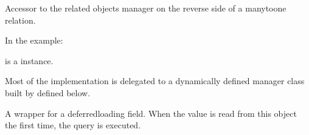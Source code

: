 \documentclass[a4paper,11pt,spanish]{sphinxmanual}
\begin{document}
\begin{fulllineitems}

\begin{fulllineitems}
\label{\detokenize{api/CashRegister/CashRegister.models:CashRegister.models.CashSession.movements}}
\pysigstartsignatures
\pysigline
{}
\pysigstopsignatures
\sphinxAtStartPar
Accessor to the related objects manager on the reverse side of a
many\sphinxhyphen{}to\sphinxhyphen{}one relation.

\sphinxAtStartPar
In the example:

\begin{sphinxVerbatim}[commandchars=\\\{\}]
       
\end{sphinxVerbatim}

\sphinxAtStartPar
{} is a  instance.

\sphinxAtStartPar
Most of the implementation is delegated to a dynamically defined manager
class built by  defined below.

\end{fulllineitems}


\begin{fulllineitems}
\label{\detokenize{api/CashRegister/CashRegister.models:CashRegister.models.CashSession.notes}}
\pysigstartsignatures
\pysigline
{}
\pysigstopsignatures
\sphinxAtStartPar
A wrapper for a deferred\sphinxhyphen{}loading field. When the value is read from this
object the first time, the query is executed.

\end{fulllineitems}



\end{fulllineitems}
\end{document}
